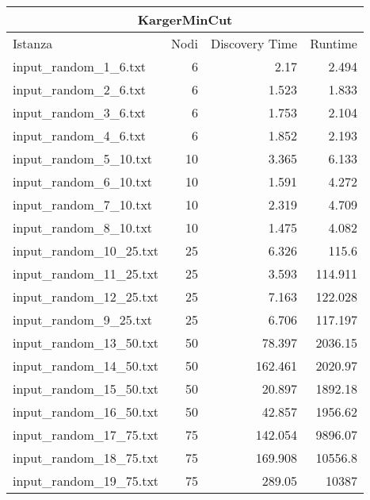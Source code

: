 \begin{table}[H]
    \centering

    \begin{tabular}{lrrr}
     \hline
     \multicolumn{4}{c}{KargerMinCut} \\
     \hline
     Istanza                    &   Nodi &   Discovery Time  &        Runtime \\
     \hline
     input\_random\_1\_6.txt    &       6 &            2.17  &          2.494 \\
     input\_random\_2\_6.txt    &       6 &            1.523 &          1.833 \\
     input\_random\_3\_6.txt    &       6 &            1.753 &          2.104 \\
     input\_random\_4\_6.txt    &       6 &            1.852 &          2.193 \\
     input\_random\_5\_10.txt   &      10 &            3.365 &          6.133 \\
     input\_random\_6\_10.txt   &      10 &            1.591 &          4.272 \\
     input\_random\_7\_10.txt   &      10 &            2.319 &          4.709 \\
     input\_random\_8\_10.txt   &      10 &            1.475 &          4.082 \\
     input\_random\_10\_25.txt  &      25 &            6.326 &        115.6   \\
     input\_random\_11\_25.txt  &      25 &            3.593 &        114.911 \\
     input\_random\_12\_25.txt  &      25 &            7.163 &        122.028 \\
     input\_random\_9\_25.txt   &      25 &            6.706 &        117.197 \\
     input\_random\_13\_50.txt  &      50 &           78.397 &       2036.15  \\
     input\_random\_14\_50.txt  &      50 &          162.461 &       2020.97  \\
     input\_random\_15\_50.txt  &      50 &           20.897 &       1892.18  \\
     input\_random\_16\_50.txt  &      50 &           42.857 &       1956.62  \\
     input\_random\_17\_75.txt  &      75 &          142.054 &       9896.07  \\
     input\_random\_18\_75.txt  &      75 &          169.908 &      10556.8   \\
     input\_random\_19\_75.txt  &      75 &          289.05  &      10387     \\

\end{tabular}
\end{table}
